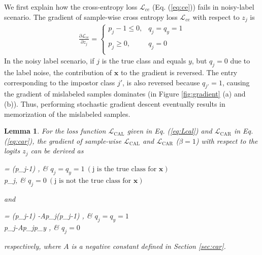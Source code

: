 \documentclass{article}
\newtheorem{lemma}{Lemma}
\begin{document}
We first explain how the cross-entropy loss $\mathcal{L}_{ce}$ (Eq. (\ref{eq:ce})) fails in noisy-label scenario. The gradient of sample-wise cross entropy loss $\mathcal{L}_{ce}$ with respect to $z_{j}$ is 
\begin{align}
	\label{eq:Dce}
	\frac{\partial \mathcal{L}_{ce}}{\partial z_{j}}=\left\{ \begin{array}{ll}
		p_{j}-1 \le 0, & q_{j}=q_{y}=1\\\\
		p_{j} \ge 0, & q_{j}=0  \\
	\end{array} \right. \end{align}
In the noisy label scenario, if $j$ is the true class and equals $y$, but $q_{j}=0$ due to the label noise, the contribution of $\bm{x}$ to the gradient is reversed. The entry corresponding to the impostor class $j'$, is also reversed because $q_{j'}=1$, causing the gradient of mislabeled samples dominates (in Figure \ref{fig:gradient} (a) and (b)). Thus, performing stochastic gradient descent eventually results in memorization of the mislabeled samples. 


\begin{lemma}
	\label{lamma1}
	For the loss function $\mathcal{L}_\text{CAL}$ given in Eq. (\ref{eq:Lcal}) and $\mathcal{L}_\text{CAR}$ in Eq. (\ref{eq:car}), the gradient of sample-wise $\mathcal{L}_\text{CAL}$ and $\mathcal{L}_\text{CAR}$ ($\beta=1$) with respect to the logits $z_{j}$ can be derived as
	\begin{subnumcases}{\label{eq:dcal} =}
		(p_{j}-1) , & $q_{j}=q_{y}=1\  (\text{j is the true class for } \bm{x})$ \label{eq:dcal_isj} \\
		p_{j}, & $q_{j}=0 \  (\text{j is not the true class for }\bm{x})$  \label{eq:dcal_isnotj}
	\end{subnumcases}
and
	\begin{subnumcases}{\label{eq:dcar} =}
		(p_{j}-1) -A\tau p_{j}(p_{j}-1) , & $q_{j}=q_{y}=1$ \label{eq:dcar_isj}\\
		p_{j}-A\tau p_{j}p_{y}  , & $q_{j}=0$ \label{eq:dcar_isnotj}
	\end{subnumcases}
respectively, where $A$ is a negative constant defined in Section \ref{sec:car}.
\end{lemma}
\end{document}
